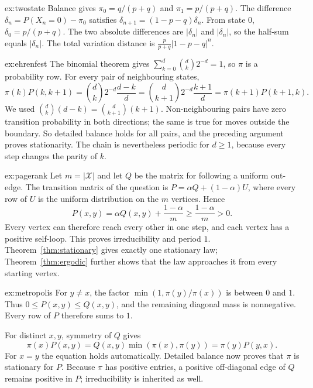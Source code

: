 \begin{solution}{ex:twostate}
\writeup Balance gives $\pi_0=q/(p+q)$ and $\pi_1=p/(p+q)$. The difference $\delta_n=P(X_n=0)-\pi_0$ satisfies $\delta_{n+1}=(1-p-q)\delta_n$. From state $0$, $\delta_0=p/(p+q)$. The two absolute differences are $|\delta_n|$ and $|\delta_n|$, so the half-sum equals $|\delta_n|$. The total variation distance is $\frac{p}{p+q}|1-p-q|^n$.
\end{solution}

\begin{solution}{ex:ehrenfest}
\writeup The binomial theorem gives $\sum_{k=0}^d\binom dk2^{-d}=1$, so $\pi$ is a probability row. For every pair of neighbouring states,
\[
 \pi(k)P(k,k+1)=\binom dk2^{-d}\frac{d-k}{d}
 =\binom d{k+1}2^{-d}\frac{k+1}{d}
 =\pi(k+1)P(k+1,k).
\]
We used $\binom dk(d-k)=\binom d{k+1}(k+1)$. Non-neighbouring pairs have zero transition probability in both directions; the same is true for moves outside the boundary. So detailed balance holds for all pairs, and the preceding argument proves stationarity. The chain is nevertheless periodic for $d\ge1$, because every step changes the parity of $k$.
\end{solution}

\begin{solution}{ex:pagerank}
\writeup Let $m=|\mathcal X|$ and let $Q$ be the matrix for following a uniform out-edge. The transition matrix of the question is $P=\alpha Q+(1-\alpha)U$, where every row of $U$ is the uniform distribution on the $m$ vertices. Hence
\[
 P(x,y)=\alpha Q(x,y)+\frac{1-\alpha}{m}
 \ge \frac{1-\alpha}{m}>0.
\]
Every vertex can therefore reach every other in one step, and each vertex has a positive self-loop. This proves irreducibility and period $1$. Theorem~\ref{thm:stationary} gives exactly one stationary law; Theorem~\ref{thm:ergodic} further shows that the law approaches it from every starting vertex.
\end{solution}

\begin{solution}{ex:metropolis}
\writeup For $y\ne x$, the factor $\min(1,\pi(y)/\pi(x))$ is between $0$ and $1$. Thus $0\le P(x,y)\le Q(x,y)$, and the remaining diagonal mass is nonnegative. Every row of $P$ therefore sums to $1$.

For distinct $x,y$, symmetry of $Q$ gives
\[
 \pi(x)P(x,y)=Q(x,y)\min(\pi(x),\pi(y))
            =\pi(y)P(y,x).
\]
For $x=y$ the equation holds automatically. Detailed balance now proves that $\pi$ is stationary for $P$. Because $\pi$ has positive entries, a positive off-diagonal edge of $Q$ remains positive in $P$; irreducibility is inherited as well.
\end{solution}


